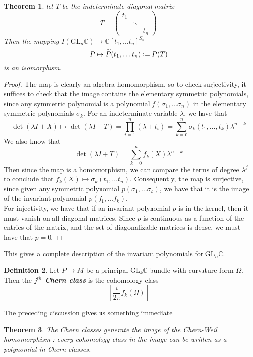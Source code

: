\documentclass[psamsfonts, 12pt]{amsart}
\newtheorem{thm}{Theorem}[section]
\theoremstyle{definition}
\newtheorem{defn}[thm]{Definition}
\theoremstyle{remark}
\newcommand{\ib}[1]{\textbf{\textit{#1}}}
\newcommand{\C}{\mathbb{C}}
\newcommand{\GL}{\mathrm{GL}}
\newcommand{\defeq}{\vcentcolon=}
\begin{document}
%
\begin{thm}
let $T$ be the indeterminate diagonal matrix
\[
T = \begin{pmatrix}
t_1 & ~ & ~ \\
~ & \ddots & ~ \\
~ & ~ & t_n
\end{pmatrix}
\]
Then the mapping $I(\GL_n\C) \to \C[t_1,\ldots t_n]^{S_n}$
\[
P \mapsto \widetilde{P}(t_1,\ldots t_n) \defeq P(T)
\]
is an isomorphism.
\end{thm}
%
\begin{proof}
The map is clearly an algebra homomorphism, so to check surjectivity, it suffices
to check that the image contains the elementary symmetric polynomials, since any
symmetric polynomial is a polynomial $f(\sigma_1, \ldots \sigma_n)$ in the
elementary symmetric polynomials $\sigma_k$. For an indeterminate variable
$\lambda$, we have that
\[
\det(\lambda I + X) \mapsto \det(\lambda I + T) = \prod_{i=1}^n (\lambda+t_i)
= \sum_{k=0}^n\sigma_k(t_1,\ldots,t_k)\lambda^{n-k}
\]
We also know that
\[
\det(\lambda I + T) = \sum_{k=0}^n f_k(X)\lambda^{n-k}
\]
Then since the map is a homomorphism, we can compare the terms of degree $\lambda^j$
to conclude that  $f_k(X) \mapsto \sigma_k(t_1,\ldots t_n)$. Consequently, the map is
surjective, since given any symmetric polynomial $p(\sigma_1,\ldots \sigma_k)$,
we have that it is the image of the invariant polynomial $p(f_1,\ldots f_k)$. \\

For injectivity, we have that if an invariant polynomial $p$ is in the kernel, then
it must vanish on all diagonal matrices. Since $p$ is continuous as a function of
the entries of the matrix, and the set of diagonalizable matrices is dense,
we must have that $p = 0$.
\end{proof}
%
This gives a complete description of the invariant polynomials for $\GL_n\C$.
%
\begin{defn}
Let $P \to M$ be a principal $\GL_k\C$ bundle  with curvature form $\Omega$.
Then the \ib{$j^{th}$ Chern class} is the cohomology class
\[
\left[\frac{i}{2\pi}f_k(\Omega)\right]
\]
\end{defn}
%
The preceding discussion gives us something immediate
%
\begin{thm}
The Chern classes generate the image of the Chern-Weil homomorphism : every
cohomology class in the image can be written as a polynomial in Chern classes.
\end{thm}
%
\iffalse
\section{The Story for Vector Bundles}
%
Every vector bundle $E \to M$ gives rise to a frame bundle $\mathcal{B}(E) \to M$.
The discussion of Chern-Weil theory and characteristic classes for vector
bundles is then subsumed by the principal bundle theory. However, we should
make sure that what we have done agrees with the usual notions on vector bundles.
In addition, we study the relationship between principal bundles and their
associated vector bundles.
\fi
%
\end{document}
